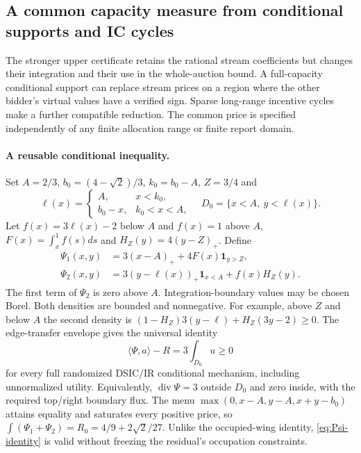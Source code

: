 \subsection{A common capacity measure from conditional supports and IC cycles}\label{sec:common-upper}
The stronger upper certificate retains the rational stream coefficients
but changes their integration and their use in the whole-auction bound.
A full-capacity conditional support can replace stream prices on a region
where the other bidder's virtual values have a verified sign. Sparse
long-range incentive cycles make a further compatible reduction.
The common price is specified independently of any finite allocation
range or finite report domain.

\paragraph{A reusable conditional inequality.}
Set $A=2/3$, $b_0=(4-\sqrt2)/3$, $k_0=b_0-A$, $Z=3/4$ and
\[
 \ell(x)=\begin{cases} A,&x<k_0,\\ b_0-x,&k_0<x<A,\end{cases}
 \quad D_0=\{x<A,\ y<\ell(x)\}.
\]
Let $f(x)=3\ell(x)-2$ below $A$ and $f(x)=1$ above $A$,
$F(x)=\int_x^1 f(s)ds$ and $H_Z(y)=4(y-Z)_+$. Define
\begin{equation}\label{eq:reusable-Psi}
\begin{split}
 \Psi_1(x,y)&=3(x-A)_++4F(x)\mathbf1_{y>Z},\\
 \Psi_2(x,y)&=3(y-\ell(x))_+\mathbf1_{x<A}+f(x)H_Z(y).
\end{split}
\end{equation}
The first term of $\Psi_2$ is zero above $A$. Integration-boundary values
may be chosen Borel. Both densities are bounded and nonnegative. For
example, above $Z$ and below $A$ the second density is
$(1-H_Z)3(y-\ell)+H_Z(3y-2)\ge0$.
The edge-transfer envelope gives the universal identity
\begin{equation}\label{eq:Psi-identity}
 \langle\Psi,a\rangle-R=3\int_{D_0}u\ge0
\end{equation}
for every full randomized DSIC/IR conditional mechanism, including
unnormalized utility. Equivalently, $\operatorname{div}\Psi=3$ outside
$D_0$ and zero inside, with the required top/right boundary flux.
The menu $\max(0,x-A,y-A,x+y-b_0)$ attains equality and saturates every
positive price, so $\int(\Psi_1+\Psi_2)=R_0=4/9+2\sqrt2/27$.
Unlike the occupied-wing identity, \eqref{eq:Psi-identity} is valid
without freezing the residual's occupation constraints.

